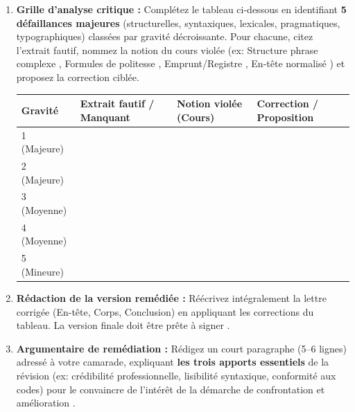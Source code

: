 \documentclass[11pt]{article}
\begin{document}
\begin{exercice}
\begin{enumerate}
    \item \textbf{Grille d'analyse critique :} Complétez le tableau ci-dessous en identifiant \textbf{5 défaillances majeures} (structurelles, syntaxiques, lexicales, pragmatiques, typographiques) classées par gravité décroissante. Pour chacune, citez l'extrait fautif, nommez la notion du cours violée (ex: \og Structure phrase complexe \fg{}, \og Formules de politesse \fg{}, \og Emprunt/Registre \fg{}, \og En-tête normalisé \fg{}) et proposez la correction ciblée.
    \begin{tabular}{|p{2.5cm}|p{3.5cm}|p{3.5cm}|p{3.5cm}|}
    \hline
    \textbf{Gravité} & \textbf{Extrait fautif / Manquant} & \textbf{Notion violée (Cours)} & \textbf{Correction / Proposition} \\
    \hline
    1 (Majeure) & & & \\
    \hline
    2 (Majeure) & & & \\
    \hline
    3 (Moyenne) & & & \\
    \hline
    4 (Moyenne) & & & \\
    \hline
    5 (Mineure) & & & \\
    \hline
    \end{tabular}
    \item \textbf{Rédaction de la version remédiée :} Réécrivez intégralement la lettre corrigée (En-tête, Corps, Conclusion) en appliquant les corrections du tableau. La version finale doit être \og prête à signer \fg{}.
    \item \textbf{Argumentaire de remédiation :} Rédigez un court paragraphe (5--6 lignes) adressé à votre camarade, expliquant \textbf{les trois apports essentiels} de la révision (ex: crédibilité professionnelle, lisibilité syntaxique, conformité aux codes) pour le convaincre de l'intérêt de la démarche de \og confrontation et amélioration \fg{}.
\end{enumerate}
\end{exercice}
\end{document}
